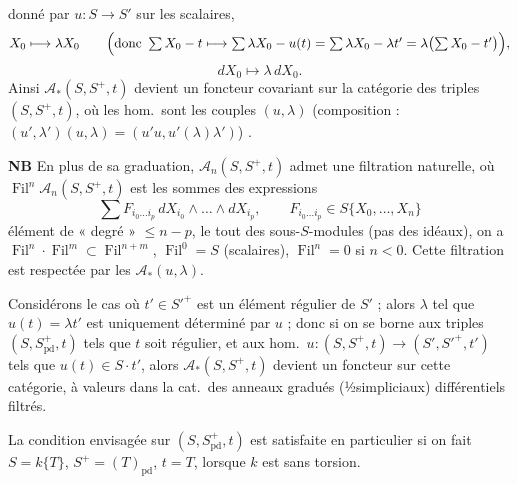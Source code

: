 \documentclass[11pt,a4paper]{article}
\begin{document}

donné par \struck{\ill{}} $u : S \to S'$ sur les scalaires,
\[
  X_0 \longmapsto \lambda X_0 \qquad
  \Bigl(\text{donc } \textstyle\sum X_0 - t \longmapsto \sum \lambda X_0 - u(t) = \sum \lambda X_0 - \lambda t' = \lambda \bigl(\sum X_0 - t'\bigr)\Bigr),
\]
\[
  dX_0 \longmapsto \lambda\, dX_0 .
\]
Ainsi $\mathcal{A}_*(S, S^+, t)$ devient un foncteur covariant \struck{\ill{}} sur la catégorie des triples $(S, S^+, t)$, où les hom.\ sont les couples $(u, \lambda)$ (composition : $(u', \lambda')(u, \lambda) = (u'u, u'(\lambda)\lambda')$) .

\textbf{NB} En plus de sa \struck{\ill{}} graduation, $\mathcal{A}_n(S, S^+, t)$ admet une filtration naturelle, où $\operatorname{Fil}^n \mathcal{A}_n(S, S^+, t)$ est \ill{} les sommes des expressions
\[
  \sum F_{i_0 \ldots i_p}\, dX_{i_0} \wedge \ldots \wedge dX_{i_p}, \qquad
  F_{i_0 \ldots i_p} \in S\{X_0, \ldots, X_n\}
\]
élément de « degré » $\leq n - p$,
le tout des sous-$S$-modules (pas des idéaux), on a $\operatorname{Fil}^n \cdot \operatorname{Fil}^m \subset \operatorname{Fil}^{n+m}$, $\operatorname{Fil}^0 = S$ (scalaires), $\operatorname{Fil}^n = 0$ si $n < 0$. Cette filtration est respectée par les $\mathcal{A}_*(u, \lambda)$.

Considérons le cas où $t' \in S'^+$ est un élément régulier de $S'$ ; alors $\lambda$ tel que $u(t) = \lambda t'$ est uniquement déterminé par $u$ ; donc si on se borne aux triples $(S, S^+_{\mathrm{pd}}, t)$ tels que $t$ soit régulier, et aux hom.\ $u : (S, S^+, t) \to (S', S'^+, t')$ tels que $u(t) \in S \cdot t'$, alors $\mathcal{A}_*(S, S^+, t)$ devient un foncteur sur cette catégorie, à valeurs dans la cat.\ des anneaux gradués (½simpliciaux)  différentiels filtrés.

La condition envisagée sur $(S, S^+_{\mathrm{pd}}, t)$ est satisfaite en particulier si on fait $S = k\{T\}$, $S^+ = (T)_{\mathrm{pd}}$, $t = T$, lorsque $k$ est sans torsion.
\end{document}
